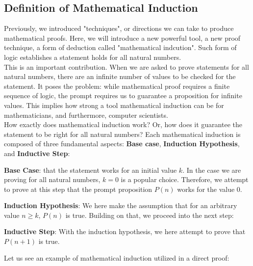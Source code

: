 \subsection{Definition of Mathematical Induction}
Previously, we introduced "techniques", or directions we can take to produce mathematical proofs. Here, we will introduce a new powerful tool, a new proof technique, a form of deduction called "mathematical indcution". Such form of logic establishes a statement holds for all natural numbers. \\
This is an important contribution. When we are asked to prove statements for all natural numbers, there are an infinite number of values to be checked for the statement. It poses the problem: while mathematical proof requires a finite sequence of logic, the prompt requires us to guarantee a proposition for infinite values. This implies how strong a tool mathematical induction can be for mathematicians, and furthermore, computer scientists. \\
How exactly does mathematical induction work? Or, how does it guarantee the statement to be right for all natural numbers? Each mathematical induction is composed of three fundamental aspects: \textbf{Base case}, \textbf{Induction Hypothesis}, and \textbf{Inductive Step}:
\begin{bindenum}
    \item \textbf{Base Case}: that the statement works for an initial value $k$. In the case we are proving for all natural numbers, $k = 0$ is a popular choice. Therefore, we attempt to prove at this step that the prompt proposition $P(n)$ works for the value $0$.
    \item \textbf{Induction Hypothesis}: We here make the assumption that for an arbitrary value $n \geq k$, $P(n)$ is true. Building on that, we proceed into the next step:
    \item \textbf{Inductive Step}: With the induction hypothesis, we here attempt to prove that $P(n + 1)$ is true.
\end{bindenum}
Let us see an example of mathematical induction utilized in a direct proof:
